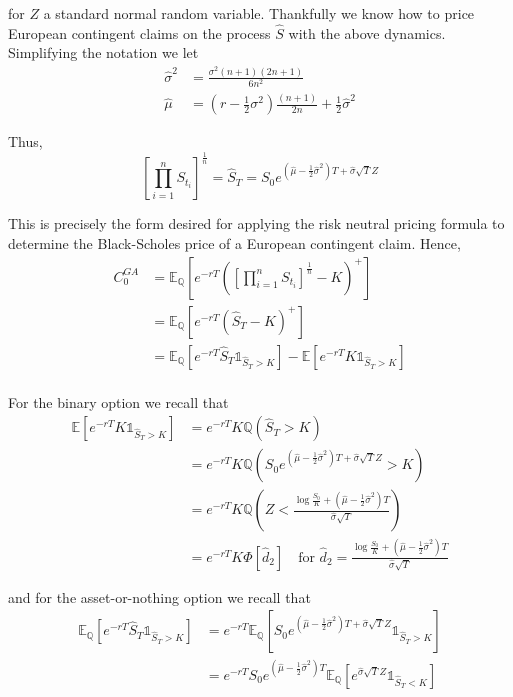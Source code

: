 \documentclass[12pt]{article}
\newlength\tindent
\renewcommand{\indent}{\hspace*{\tindent}}
\begin{document}
for $Z$ a standard normal random variable. Thankfully we know how to price European contingent claims on the process $\hat{S}$ with the above dynamics. Simplifying the notation we let
\begin{align*}
	\hat{\sigma}^2 &= \frac{\sigma^2(n + 1)(2n + 1)}{6n^2} \\
	\hat{\mu} &= \left(r - \frac{1}{2}\sigma^2\right)\frac{(n + 1)}{2n} + \frac{1}{2}\hat{\sigma}^2
\end{align*}

Thus,
\begin{equation*}
	\left[ \prod^n_{i=1} S_{t_i} \right]^{\frac{1}{n}} = \hat{S}_T = S_0 e^{ \left(\hat{\mu} - \frac{1}{2}\hat{\sigma}^2\right)T + \hat{\sigma}\sqrt{T}Z }
\end{equation*}

\indent This is precisely the form desired for applying the risk neutral pricing formula to determine the Black-Scholes price of a European contingent claim. Hence,
\begin{align*}
	C^{GA}_0 &= \mathbb E_{\mathbb Q} \left[ e^{-rT} \left( \left[ \prod^n_{i=1} S_{t_i} \right]^{\frac{1}{n}} - K \right)^+ \right] \\
	&= \mathbb E_{\mathbb Q} \left[ e^{-rT} \left(\hat{S}_T - K\right)^+ \right] \\
	&= \mathbb E_{\mathbb Q} \left[ e^{-rT} \hat{S}_T \mathds 1_{\hat{S}_T > K} \right] - \mathbb E \left[e^{-rT}K \mathds 1_{\hat{S}_T > K} \right] \\
\end{align*}

For the binary option we recall that 
\begin{align*}
	\mathbb E \left[e^{-rT}K \mathds 1_{\hat{S}_T > K} \right] &= e^{-rT}K\mathbb Q \left(\hat{S}_T > K \right) \\
	&= e^{-rT}K \mathbb Q \left( S_0 e^{ \left(\hat{\mu} - \frac{1}{2}\hat{\sigma}^2\right)T + \hat{\sigma}\sqrt{T}Z } > K \right) \\
	&= e^{-rT}K \mathbb Q \left( Z < \frac{ \log \frac{S_0}{K} + \left(\hat{\mu} - \frac{1}{2}\hat{\sigma}^2\right)T }{ \hat{\sigma}\sqrt{T} }   \right) \\
	&= e^{-rT}K \Phi[\hat{d}_2] \quad \text{for } \hat{d}_2 = \frac{ \log \frac{S_0}{K} + \left(\hat{\mu} - \frac{1}{2}\hat{\sigma}^2\right)T }{ \hat{\sigma}\sqrt{T} }
\end{align*}

and for the asset-or-nothing option we recall that
\begin{align*}
	\mathbb E_{\mathbb Q} \left[ e^{-rT} \hat{S}_T \mathds 1_{\hat{S}_T > K} \right] &= e^{-rT}\mathbb E_{\mathbb Q} \left[ S_0 e^{ \left(\hat{\mu} - \frac{1}{2}\hat{\sigma}^2\right)T + \hat{\sigma}\sqrt{T}Z } \mathds 1_{\hat{S}_T > K} \right] \\
	&= e^{-rT} S_0 e^{ \left(\hat{\mu} - \frac{1}{2}\hat{\sigma}^2\right)T} \mathbb E_{\mathbb Q} \left[ e^{ \hat{\sigma}\sqrt{T}Z } \mathds 1_{\hat{S}_T < K} \right]
\end{align*}
\end{document}
